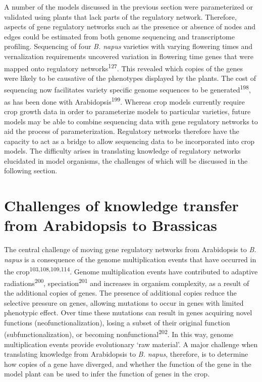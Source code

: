 \documentclass[12pt,]{book}
\begin{document}
A number of the models discussed in the previous section were
parameterized or validated using plants that lack parts of the
regulatory network. Therefore, aspects of gene regulatory networks such
as the presence or absence of nodes and edges could be estimated from
both genome sequencing and transcriptome profiling. Sequencing of four
\emph{B. napus} varieties with varying flowering times and vernalization
requirements uncovered variation in flowering time genes that were
mapped onto regulatory networks\textsuperscript{127}. This revealed
which copies of the genes were likely to be causative of the phenotypes
displayed by the plants. The cost of sequencing now facilitates variety
specific genome sequences to be generated\textsuperscript{198}, as has
been done with Arabidopsis\textsuperscript{199}. Whereas crop models
currently require crop growth data in order to parameterize models to
particular varieties, future models may be able to combine sequencing
data with gene regulatory networks to aid the process of
parameterization. Regulatory networks therefore have the capacity to act
as a bridge to allow sequencing data to be incorporated into crop
models. The difficulty arises in translating knowledge of regulatory
networks elucidated in model organisms, the challenges of which will be
discussed in the following section.

\section{Challenges of knowledge transfer from Arabidopsis to
Brassicas}\label{challenges-of-knowledge-transfer-from-arabidopsis-to-brassicas}

The central challenge of moving gene regulatory networks from
Arabidopsis to \emph{B. napus} is a consequence of the genome
multiplication events that have occurred in the
crop\textsuperscript{103,108,109,114}. Genome multiplication events have
contributed to adaptive radiations\textsuperscript{200},
speciation\textsuperscript{201} and increases in organism complexity, as
a result of the additional copies of genes. The presence of additional
copies reduce the selective pressure on genes, allowing mutations to
occur in genes with limited phenotypic effect. Over time these mutations
can result in genes acquiring novel functions (neofunctionalization),
losing a subset of their original function (subfunctionalization), or
becoming nonfunctional\textsuperscript{202}. In this way, genome
multiplication events provide evolutionary `raw material'. A major
challenge when translating knowledge from Arabidopsis to \emph{B.
napus}, therefore, is to determine how copies of a gene have diverged,
and whether the function of the gene in the model plant can be used to
infer the function of genes in the crop.
\end{document}
